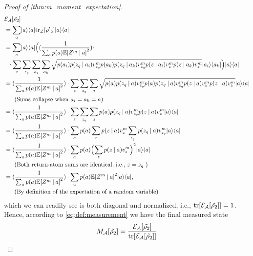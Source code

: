\documentclass{article}
\DeclarePairedDelimiter{\bra}{\langle}{\rvert} %
\DeclarePairedDelimiter{\ket}{\lvert}{\rangle} %
\DeclarePairedDelimiter{\paren}{\lparen}{\rparen} %
\DeclarePairedDelimiter{\bparen}{[}{]} %
\newcommand{\E}{\mathbb{E}} %
\newcommand{\bfunc}[2]{#1\bparen*{#2}} %
\newcommand{\given}[1][]{\:#1\vert\:}
\begin{document}
\begin{proof}[Proof of \cref{thm:m_moment_expectation}]
% 
\begin{align}
&\bfunc{\mathcal{E}_{\mathcal{A}}}{\tilde{\rho_2}}
\\&= \sum_{a} \ket{a}\bra{a} \bfunc{\textrm{tr}_{\mathcal{Z}}}{{\rho'}_2} \ket{a}\bra{a}
\\&= \sum_{a} \ket{a}\bra{a} \Bigr( (\frac{1}{\sum_{a} p(a) \bfunc{\mathbb{E}}{Z^{m} \given a}^2}) \cdot 
\\&~~\cdot \sum_{z} \sum_{z_q} \sum_{a_i} \sum_{a_k} \sqrt{ p(a_i) p(z_q \given a_i) v_{z_q}^{m} p(a_k) p(z_q \given a_k) v_{z_q}^{m} p(z \given a_i) v_{z}^{m} p(z \given a_k) v_{z}^{m}} \ket{a_i}\bra{a_k} \Bigl) \ket{a}\bra{a}
% 
\\&= (\frac{1}{\sum_{a} p(a) \bfunc{\mathbb{E}}{Z^{m} \given a}^2}) \cdot \sum_{z} \sum_{z_q} \sum_{a} \sqrt{p(a) p(z_q \given a) v_{z_q}^{m} p(a) p(z_q \given a) v_{z_q}^{m} p(z \given a) v_{z}^{m} p(z \given a) v_{z}^{m}} \ket{a}\bra{a}
\\&~~~~~\textrm{(Sums collapse when} ~ a_i = a_k = a \textrm{)}\nonumber
% 
\\&= (\frac{1}{\sum_{a} p(a) \bfunc{\mathbb{E}}{Z^{m} \given a}^2}) \cdot \sum_{z} \sum_{z_q} \sum_{a} p(a) p(z_q \given a) v_{z_q}^{m} p(z \given a) v_{z}^{m} \ket{a}\bra{a}
\\&= (\frac{1}{\sum_{a} p(a) \bfunc{\mathbb{E}}{Z^{m} \given a}^2}) \cdot \sum_{a} p(a) \sum_{z} p(z \given a) v_{z}^{m} \sum_{z_q} p(z_q \given a) v_{z_q}^{m} \ket{a}\bra{a}
\\&= (\frac{1}{\sum_{a} p(a) \bfunc{\mathbb{E}}{Z^{m} \given a}^2}) \cdot \sum_{a} p(a) \paren[\Big]{\sum_{z} p(z \given a) v_{z}^{m}}^2 \ket{a}\bra{a}
\\&~~~~~\textrm{(Both return-atom sums are identical, i.e.,}~ z = z_q ~\textrm{)}\nonumber
\\&= (\frac{1}{\sum_{a} p(a) \bfunc{\mathbb{E}}{Z^{m} \given a}^2}) \cdot \sum_{a} p(a) \bfunc{\mathbb{E}}{Z^{m} \given a}^2 \ket{a}\bra{a},
\\&~~~~~\textrm{(By definition of the expectation of a random variable)} \nonumber
\end{align}
% 
which we can readily see is both diagonal and normalized, i.e., $\bfunc{\textrm{tr}}{\bfunc{\mathcal{E}_{\mathcal{A}}}{\tilde{\rho_2}}} = 1$. Hence, according to \cref{eq:def:measurement} we have the final measured state
% 
\begin{equation}
\bfunc{M_{\mathcal{A}}}{\tilde{\rho_2}}
= \frac{\bfunc{\mathcal{E}_{\mathcal{A}}}{\tilde{\rho_2}}}{\bfunc{\textrm{tr}}{\bfunc{\mathcal{E}_{\mathcal{A}}}{\tilde{\rho_2}}}}

\end{equation}
\end{proof}
\end{document}
